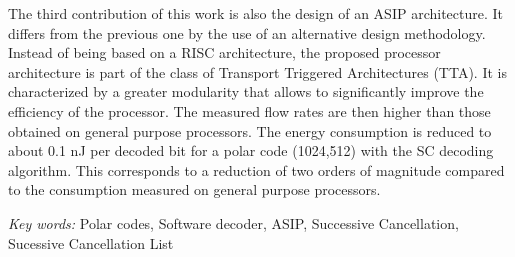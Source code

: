 The third contribution of this work is also the design of an ASIP architecture. It differs from the previous one by the use of an alternative design methodology. Instead of being based on a RISC architecture, the proposed processor architecture is part of the class of Transport Triggered Architectures (TTA). It is characterized by a greater modularity that allows to significantly improve the efficiency of the processor. The measured flow rates are then higher than those obtained on general purpose processors. The energy consumption is reduced to about 0.1 nJ per decoded bit for a polar code (1024,512) with the SC decoding algorithm. This corresponds to a reduction of two orders of magnitude compared to the consumption measured on general purpose processors.

\vskip0.5cm
\emph{Key words:} Polar codes, Software decoder, ASIP, Successive Cancellation, Sucessive Cancellation List
